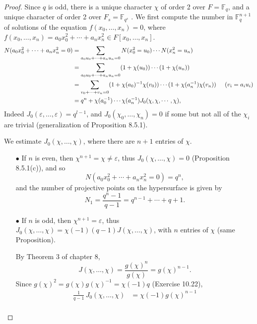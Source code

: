 \documentclass[11pt,a4paper]{article}
\newcommand{\F}{\mathbb{F}}
\begin{document}
\begin{proof}
Since $q$ is odd, there is a unique character $\chi$ of order 2 over $F = \F_q$, and a unique character of order 2 over $F_s = \F_{q^s}$ . We first compute the number in $\F_q^{n+1}$ of solutions of the equation $f(x_0,\ldots,x_n) = 0$, where $f(x_0,\ldots,x_n) = a_0x_0^2+\cdots+a_n x_n^2\in F[x_0,\ldots,x_n]$.
\begin{align*}
N(a_0x_0^2+\cdots+a_n x_n^2=0)&=\sum\limits_{a_0u_0+\cdots+a_n u_n=0}N(x_0^2=u_0)\cdots N(x_n^2=u_n)\\
&=\sum\limits_{a_0u_0+\cdots+a_n u_n=0}(1+\chi(u_0))\cdots(1+\chi(u_n)) \\
&=\sum\limits_{v_0+\cdots+v_n=0}(1+\chi(a_0)^{-1}\chi(v_0))\cdots(1+\chi(a_n^{-1})\chi(v_n)) \hspace{0.5cm}(v_i = a_i u_i)\\
&=q^{n} + \chi(a_0^{-1})\cdots\chi(a_n^{-1})J_0(\chi,\chi,\cdots,\chi),
\end{align*}
Indeed $J_0(\varepsilon,\ldots,\varepsilon) = q^{l-1}$, and $J_0(\chi_0,\ldots,\chi_n)= 0$ if some but not all of the $\chi_i$ are trivial (generalization of Proposition 8.5.1).

We estimate $J_0(\chi,\ldots,\chi)$, where there are $n+1$ entries of $\chi$.

\begin{enumerate}
\item[$\bullet$] If $n$ is even, then $\chi^{n+1} = \chi \ne \varepsilon$, thus $J_0(\chi,\ldots,\chi) = 0$ (Proposition 8.5.1(c)), and so
$$N(a_0x_0^2+\cdots+a_n x_n^2=0) = q^{n},$$
and the number of projective points on the hypersurface is given by 
$$N_1 = \frac{q^n -1}{q-1} = q^{n-1} + \cdots + q + 1.$$
\item[$\bullet$] If $n$ is odd, then $\chi^{n+1} = \varepsilon$, thus $J_0(\chi,\ldots,\chi) = \chi(-1)(q-1) J(\chi,\ldots,\chi)$, with $n$ entries of $\chi$ (same Proposition).

By Theorem 3 of chapter 8,
$$J(\chi,\ldots,\chi) = \frac{g(\chi)^n}{g(\chi)} = g(\chi)^{n-1}.$$
Since $g(\chi)^2 = g(\chi) g(\chi)^{-1}= \chi(-1)q$ (Exercise 10.22), 
\begin{align*}
\frac{1}{q-1} \, J_0(\chi,\ldots,\chi) &= \chi(-1)g(\chi)^{n-1}\\


\end{align*}
\end{enumerate}
\end{proof}
\end{document}
